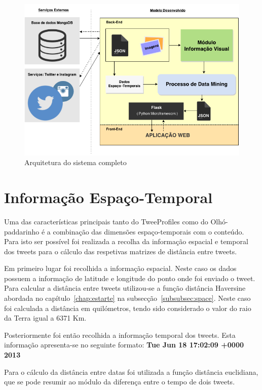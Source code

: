 \begin{figure}[h]
\centering
\includegraphics[width=1.0\linewidth]{./figures/arquitetura_sistema}
\caption{Arquitetura do sistema completo}
\label{fig:archsys}
\end{figure}


\section{Informação Espaço-Temporal} \label{sec:infoesptmp}

Uma das características principais tanto do TweeProfiles como do Olhó-paddarinho é a combinação das dimensões espaço-temporais com o conteúdo. Para isto ser possível foi realizada a recolha da informação espacial e temporal dos tweets para o cálculo das respetivas matrizes de distância entre tweets.

Em primeiro lugar foi recolhida a informação espacial. Neste caso os dados possuem a informação de latitude e longitude do ponto onde foi enviado o tweet. Para calcular a distância entre tweets utilizou-se a função distância Haversine abordada no capítulo~\ref{chap:estarte} na subsecção~\ref{subsubsec:space}. Neste caso foi calculada a distância em quilómetros, tendo sido considerado o valor do raio da Terra igual a 6371 Km.

Posteriormente foi então recolhida a informação temporal dos tweets. Esta informação apresenta-se no seguinte formato: \textbf{Tue Jun 18 17:02:09 +0000 2013}

Para o cálculo da distância entre datas foi utilizada a função distância euclidiana, que se pode resumir ao módulo da diferença entre o tempo de dois tweets.

